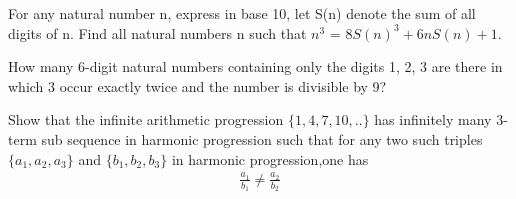 \item For any natural number n, express in base 10, let S(n) denote the sum of all digits of n. Find all natural numbers n such that $n^{3}$ = $8S(n)^{3} + 6nS(n) + 1$.

\item How many 6-digit natural numbers containing only the digits 1, 2, 3 are there in which 3 occur exactly twice and the number is divisible by 9?

\item Show that the infinite arithmetic progression $\{1, 4, 7, 10,..\}$ has infinitely many 3-term sub sequence in harmonic progression such that for any two such triples $\{a_1, a_2, a_3\}$ and $\{b_1, b_2, b_3\}$ in harmonic progression,one has
\begin{align*}
\frac{a_1}{b_1} \neq \frac{a_2}{b_2}
\end{align*}
